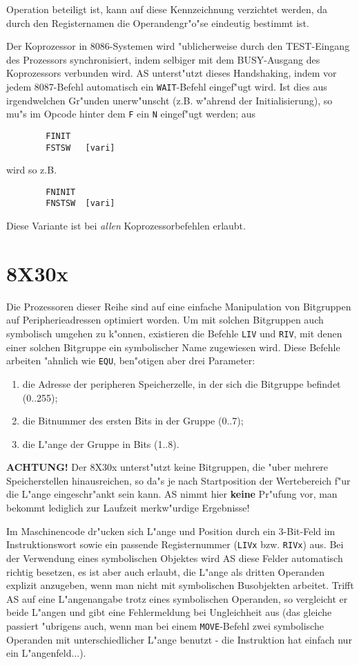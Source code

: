 \documentclass[12pt,a4paper,twoside]{report}
\newcommand{\ii}[1]{{\it #1}}
\newcommand{\bb}[1]{{\bf #1}}
\newcommand{\tty}[1]{{\tt #1}}
\begin{document}
{Operation beteiligt ist, kann auf diese Kennzeichnung verzichtet werden, da
durch den Registernamen die Operandengr"o"se eindeutig bestimmt ist.
\par
Der Koprozessor in 8086-Systemen wird "ublicherweise durch den TEST-Eingang
des Prozessors synchronisiert, indem selbiger mit dem BUSY-Ausgang des
Koprozessors verbunden wird.  AS unterst"utzt dieses Handshaking, indem
vor jedem 8087-Befehl automatisch ein \tty{WAIT}-Befehl eingef"ugt wird.  Ist
dies aus irgendwelchen Gr"unden unerw"unscht (z.B. w"ahrend der
Initialisierung), so mu"s im Opcode hinter dem \tty{F} ein \tty{N} eingef"ugt 
werden; aus
\begin{verbatim}
        FINIT
        FSTSW   [vari]
\end{verbatim}
wird so z.B.
\begin{verbatim}
        FNINIT
        FNSTSW  [vari]
\end{verbatim}
Diese Variante ist bei \ii{allen} Koprozessorbefehlen erlaubt.


\section{8X30x}
\label{8X30xSpec}

Die Prozessoren dieser Reihe sind auf eine einfache Manipulation von
Bitgruppen auf Peripherieadressen optimiert worden.  Um mit solchen
Bitgruppen auch symbolisch umgehen zu k"onnen, existieren die Befehle
\tty{LIV} und \tty{RIV}, mit denen einer solchen Bitgruppe ein
symbolischer Name zugewiesen wird.  Diese Befehle arbeiten "ahnlich
wie \tty{EQU}, ben"otigen aber drei Parameter:
\begin{enumerate}
\item{die Adresse der peripheren Speicherzelle, in der sich die
      Bitgruppe befindet (0..255);}
\item{die Bitnummer des ersten Bits in der Gruppe (0..7);}
\item{die L"ange der Gruppe in Bits (1..8).}
\end{enumerate}
\bb{ACHTUNG!}  Der 8X30x unterst"utzt keine Bitgruppen, die "uber mehrere
Speicherstellen hinausreichen, so da"s je nach Startposition der
Wertebereich f"ur die L"ange eingeschr"ankt sein kann.  AS nimmt hier
\bb{keine} Pr"ufung vor, man bekommt lediglich zur Laufzeit merkw"urdige
Ergebnisse!

Im Maschinencode dr"ucken sich L"ange und Position durch ein 3-Bit-Feld
im Instruktionswort sowie ein passende Registernummer (\tty{LIVx} bzw.
\tty{RIVx}) aus.  Bei der Verwendung eines symbolischen Objektes wird AS
diese Felder automatisch richtig besetzen, es ist aber auch erlaubt,
die L"ange als dritten Operanden explizit anzugeben, wenn man nicht
mit symbolischen Busobjekten arbeitet.  Trifft AS auf eine L"angenangabe
trotz eines symbolischen Operanden, so vergleicht er beide L"angen
und gibt eine Fehlermeldung bei Ungleichheit aus (das gleiche passiert
"ubrigens auch, wenn man bei einem \tty{MOVE}-Befehl zwei symbolische
Operanden mit unterschiedlicher L"ange benutzt - die Instruktion hat
einfach nur ein L"angenfeld...).

}
\end{document}
